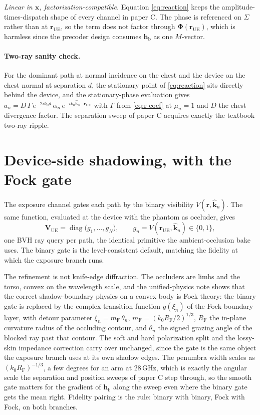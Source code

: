 \documentclass[11pt]{article}
\newcommand{\khat}{\hat{\bm{k}}}
\newcommand{\rr}{\mathbf{r}}
\newcommand{\xx}{\mathbf{x}}
\newcommand{\hh}{\mathbf{h}}
\newcommand{\Phimat}{\mathbf{\Phi}}
\newcommand{\Vis}{V}
\newcommand{\rue}{\rr_{\mathrm{UE}}}
\newcommand{\hb}{\hh_{\mathrm{b}}}
\newcommand{\mfock}{m_{\mathrm{F}}}
\DeclareMathOperator{\diag}{diag}
\theoremstyle{remark}
\begin{document}
\emph{Linear in $\xx$, factorization-compatible.} Equation
\cref{eq:reaction} keeps the amplitude-times-dispatch shape of every
channel in paper C. The phase is referenced on $\Sigma$ rather than
at $\rue$, so the term does not factor through $\Phimat(\rue)$, which
is harmless since the precoder design consumes $\hb$ as one
$M$-vector.

\paragraph{Two-ray sanity check.}
For the dominant path at normal incidence on the chest and the device
on the chest normal at separation $d$, the stationary point of
\cref{eq:reaction} sits directly behind the device, and the
stationary-phase evaluation gives
$a_n = D\, \Gamma\, e^{-2 i k_0 d}\, \alpha_n\,
e^{-i k_0 \khat_n \cdot \rue}$ with $\Gamma$ from \cref{eq:r-coef} at
$\mu_n = 1$ and $D$ the chest divergence factor. The separation sweep
of paper C acquires exactly the textbook two-ray ripple.

\section{Device-side shadowing, with the Fock gate}
\label{sec:shadow}

The exposure channel gates each path by the binary visibility
$\Vis(\rr, \khat_n)$. The same function, evaluated at the device with
the phantom as occluder, gives
\begin{equation}\label{eq:Vue}
  \mathbf{V}_{\mathrm{UE}}
  = \diag\bigl(g_1, \ldots, g_N\bigr),
  \qquad
  g_n = \Vis(\rue, \khat_n) \in \{0, 1\},
\end{equation}
one BVH ray query per path, the identical primitive the
ambient-occlusion bake uses. The binary gate is the level-consistent
default, matching the fidelity at which the exposure branch runs.

The refinement is not knife-edge diffraction. The occluders are
limbs and the torso, convex on the wavelength scale, and the
unified-physics note shows that the correct shadow-boundary physics
on a convex body is Fock theory: the binary gate is replaced by the
complex transition function $g(\xi_n)$ of the Fock boundary layer,
with detour parameter $\xi_n = \mfock\,\theta_n$,
$\mfock = (k_0 R_{\mathrm{F}}/2)^{1/3}$, $R_{\mathrm{F}}$ the
in-plane curvature radius of the occluding contour, and $\theta_n$
the signed grazing angle of the blocked ray past that contour. The
soft and hard polarization split and the lossy-skin impedance
correction carry over unchanged, since the gate is the same object
the exposure branch uses at its own shadow edges. The penumbra width
scales as $(k_0 R_{\mathrm{F}})^{-1/3}$, a few degrees for an arm at
28\,GHz, which is exactly the angular scale the separation and
position sweeps of paper C step through, so the smooth gate matters
for the gradient of $\hb$ along the sweep even where the binary gate
gets the mean right. Fidelity pairing is the rule: binary with
binary, Fock with Fock, on both branches.
\end{document}
